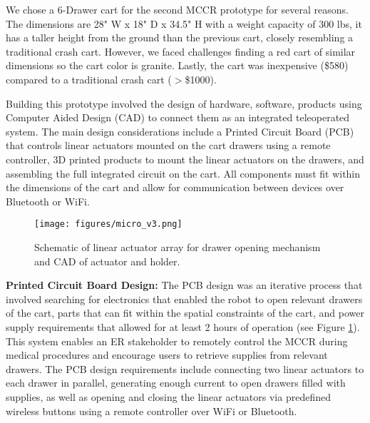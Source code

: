 We chose a 6-Drawer cart for the second MCCR prototype for several reasons. 
The dimensions are 28" W x 18" D x 34.5" H with a weight capacity of 300 lbs, it has a taller height from the ground than the previous cart, closely resembling a traditional crash cart.
However, we faced challenges finding a red cart of similar dimensions so the cart color is granite.
Lastly, the cart was inexpensive (\$580) compared to a traditional crash cart ($>$\$1000).


Building this prototype involved the design of hardware, software, products using Computer Aided Design (CAD) to connect them as an integrated teleoperated system.
The main design considerations include a Printed Circuit Board (PCB) that controls linear actuators mounted on the cart drawers using a remote controller, 3D printed products to mount the linear actuators on the drawers, and assembling the full integrated circuit on the cart.
All components must fit within the dimensions of the cart and allow for communication between devices over Bluetooth or WiFi.

\begin{figure}[t] 
	\centering 
	\texttt{[image: figures/micro\_v3.png]} 
	\caption{Schematic of linear actuator array for drawer opening mechanism and CAD of actuator and holder.}%
	\label{fig:pcb} 
\end{figure}


\textbf{Printed Circuit Board Design:} The PCB design was an iterative process that involved searching for electronics that enabled the robot to open relevant drawers of the cart, parts that can fit within the spatial constraints of the cart, and power supply requirements that allowed for at least 2 hours of operation (see Figure \ref{fig:pcb}).
This system enables an ER stakeholder to remotely control the MCCR during medical procedures and encourage users to retrieve supplies from relevant drawers. 
The PCB design requirements include connecting two linear actuators to each drawer in parallel, generating enough current to open drawers filled with supplies, as well as opening and closing the linear actuators via predefined wireless buttons using a remote controller over WiFi or Bluetooth.

